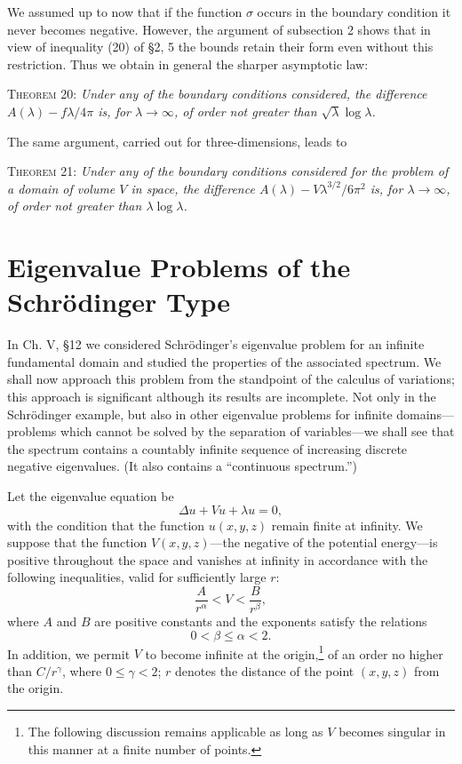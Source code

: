 We assumed up to now that if the function $\sigma$ occurs in the boundary condition it never becomes negative. However, the argument of subsection 2 shows that in view of inequality (20) of \S2, 5 the bounds retain their form even without this restriction. Thus we obtain in general the sharper asymptotic law:

\textsc{Theorem 20:} \emph{Under any of the boundary conditions considered, the difference $A(\lambda)-f\lambda/4\pi$ is, for $\lambda\to\infty$, of order not greater than $\sqrt\lambda\log\lambda$.}

The same argument, carried out for three-dimensions, leads to

\textsc{Theorem 21:} \emph{Under any of the boundary conditions considered for the problem of a domain of volume $V$ in space, the difference $A(\lambda)-V\lambda^{3/2}/6\pi^2$ is, for $\lambda\to\infty$, of order not greater than $\lambda\log\lambda$.}

\section{Eigenvalue Problems of the Schrödinger Type}
In Ch. V, \S12 we considered Schrödinger's eigenvalue problem for an infinite fundamental domain and studied the properties of the associated spectrum. We shall now approach this problem from the standpoint of the calculus of variations; this approach is significant although its results are incomplete. Not only in the Schrödinger example, but also in other eigenvalue problems for infinite domains---problems which cannot be solved by the separation of variables---we shall see that the spectrum contains a countably infinite sequence of increasing discrete negative eigenvalues. (It also contains a ``continuous spectrum.'')

Let the eigenvalue equation be
\begin{equation}\tag{41}
\Delta u+Vu+\lambda u=0,
\end{equation}
with the condition that the function $u(x,y,z)$ remain finite at infinity. We suppose that the function $V(x,y,z)$---the negative of the potential energy---is positive throughout the space and vanishes at infinity in accordance with the following inequalities, valid for sufficiently large $r$:
\begin{equation}\tag{42}
\frac{A}{r^\alpha}<V<\frac{B}{r^\beta},
\end{equation}
where $A$ and $B$ are positive constants and the exponents satisfy the relations
\[
0<\beta\le\alpha<2.
\]
In addition, we permit $V$ to become infinite at the origin,\footnote{The following discussion remains applicable as long as $V$ becomes singular in this manner at a finite number of points.} of an order no higher than $C/r^\gamma$, where $0\le\gamma<2$; $r$ denotes the distance of the point $(x,y,z)$ from the origin.

